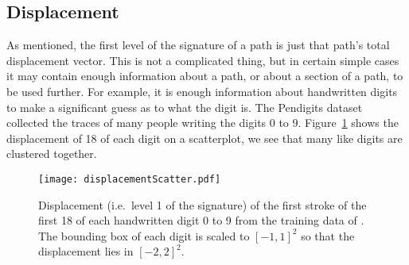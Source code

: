 

\subsection{Displacement}
As mentioned, the first level of the signature of a path is just that path's total displacement vector. 
This is not a complicated thing, but in certain simple cases it may contain enough information about a path, or about a section of a path, to be used further.
For example, it is enough information about handwritten digits to make a significant guess as to what the digit is. 
The Pendigits dataset \cite{pendigits} collected the traces of many people writing the digits 0 to 9. 
Figure~\ref{fig:displacement} shows the displacement of 18 of each digit on a scatterplot, we see that many like digits are clustered together.

\begin{figure}
\texttt{[image: displacementScatter.pdf]}
\caption[Displacement of the first stroke of handwritten digits from Pendigits]{\label{fig:displacement}Displacement (i.e.~level 1 of the signature) of the first stroke of the first 18 of each handwritten digit 0 to 9 from the training data of \cite{pendigits}. 
The bounding box of each digit is scaled to $[-1,1]^2$ so that the displacement lies in $[-2,2]^2$.}
\end{figure}

